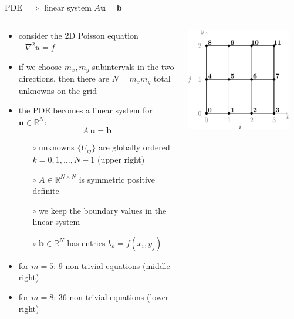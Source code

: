 \documentclass[10pt,
               svgnames,
               hyperref={colorlinks,citecolor=DeepPink4,linkcolor=FireBrick,urlcolor=Maroon},
               usepdftitle=false]{beamer}
\newcommand{\bb}{\mathbf{b}}
\newcommand{\bu}{\mathbf{u}}
\newcommand{\RR}{\mathbb{R}}
\newcommand{\grad}{\nabla}
\begin{document}
\begin{frame}{PDE $\implies$ linear system $A\bu=\bb$}
\begin{columns}
\begin{column}{0.73\textwidth}
\begin{itemize}
\item consider the 2D Poisson equation $-\grad^2 u = f$
\item if we choose $m_x,m_y$ subintervals in the two directions, then there are $N=m_x m_y$ total unknowns on the grid
\item the PDE becomes a linear system for $\bu \in \RR^N$:
	$$A\, \bu = \bb$$

	\begin{itemize}
	\item[$\circ$] unknowns $\{U_{ij}\}$ are globally ordered $k=0,1,\dots,N-1$ (upper right)
	\item[$\circ$] $A \in \RR^{N\times N}$ is symmetric positive definite
	\item[$\circ$] we keep the boundary values in the linear system
	\item[$\circ$] $\bb \in \RR^N$ has entries $b_k = f(x_i,y_j)$
	\end{itemize}
\item for $m=5$: 9 non-trivial equations (middle right)
\item for $m=8$: 36 non-trivial equations (lower right)
\end{itemize}
\end{column}
\begin{column}{0.27\textwidth}
\hfill \includegraphics[width=0.9\textwidth]{images/gridordering.png}


\end{column}
\end{columns}
\end{frame}
\end{document}
